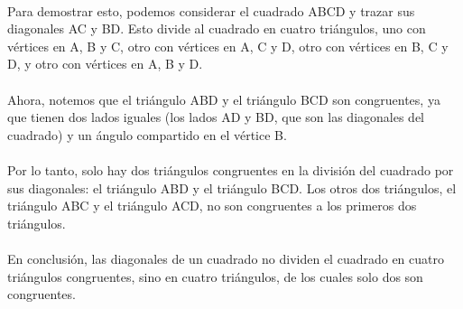 \documentclass{article}
\begin{document}
\\
Para demostrar esto, podemos considerar el cuadrado ABCD y trazar sus diagonales AC y BD. Esto divide al cuadrado en cuatro triángulos, uno con vértices en A, B y C, otro con vértices en A, C y D, otro con vértices en B, C y D, y otro con vértices en A, B y D.\\
\\
Ahora, notemos que el triángulo ABD y el triángulo BCD son congruentes, ya que tienen dos lados iguales (los lados AD y BD, que son las diagonales del cuadrado) y un ángulo compartido en el vértice B.\\
\\
Por lo tanto, solo hay dos triángulos congruentes en la división del cuadrado por sus diagonales: el triángulo ABD y el triángulo BCD. Los otros dos triángulos, el triángulo ABC y el triángulo ACD, no son congruentes a los primeros dos triángulos.\\
\\
En conclusión, las diagonales de un cuadrado no dividen el cuadrado en cuatro triángulos congruentes, sino en cuatro triángulos, de los cuales solo dos son congruentes.\\
\end{document}
